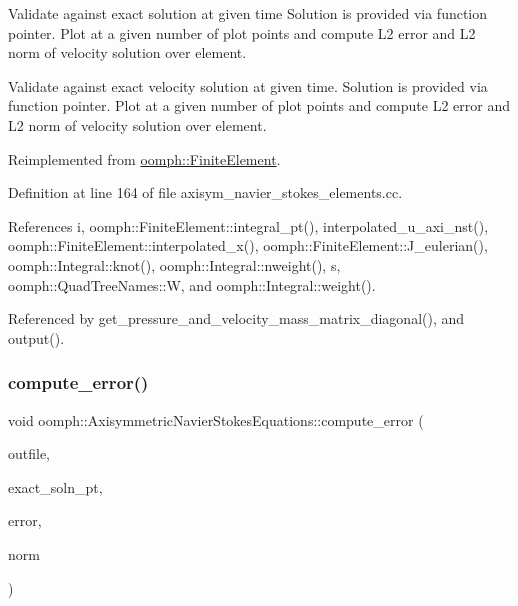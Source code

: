 Validate against exact solution at given time Solution is provided via function pointer. Plot at a given number of plot points and compute L2 error and L2 norm of velocity solution over element. 

Validate against exact velocity solution at given time. Solution is provided via function pointer. Plot at a given number of plot points and compute L2 error and L2 norm of velocity solution over element. 

Reimplemented from \hyperlink{classoomph_1_1FiniteElement_a7f67853506dc73fa6b7505108de22d1f}{oomph\+::\+Finite\+Element}.



Definition at line 164 of file axisym\+\_\+navier\+\_\+stokes\+\_\+elements.\+cc.



References i, oomph\+::\+Finite\+Element\+::integral\+\_\+pt(), interpolated\+\_\+u\+\_\+axi\+\_\+nst(), oomph\+::\+Finite\+Element\+::interpolated\+\_\+x(), oomph\+::\+Finite\+Element\+::\+J\+\_\+eulerian(), oomph\+::\+Integral\+::knot(), oomph\+::\+Integral\+::nweight(), s, oomph\+::\+Quad\+Tree\+Names\+::W, and oomph\+::\+Integral\+::weight().



Referenced by get\+\_\+pressure\+\_\+and\+\_\+velocity\+\_\+mass\+\_\+matrix\+\_\+diagonal(), and output().

\mbox{\label{classoomph_1_1AxisymmetricNavierStokesEquations_af7cc7591c11d44f8d426502b3bd5c81f}} 
\subsubsection{\texorpdfstring{compute\+\_\+error()}{compute\_error()}\hspace{0.1cm}{\footnotesize\ttfamily [2/2]}}
{\footnotesize\ttfamily void oomph\+::\+Axisymmetric\+Navier\+Stokes\+Equations\+::compute\+\_\+error (\begin{DoxyParamCaption}\item[{std\+::ostream \&}]{outfile,  }\item[{\hyperlink{classoomph_1_1FiniteElement_a690fd33af26cc3e84f39bba6d5a85202}{Finite\+Element\+::\+Steady\+Exact\+Solution\+Fct\+Pt}}]{exact\+\_\+soln\+\_\+pt,  }\item[{double \&}]{error,  }\item[{double \&}]{norm }\end{DoxyParamCaption})\hspace{0.3cm}{\ttfamily [virtual]}}



